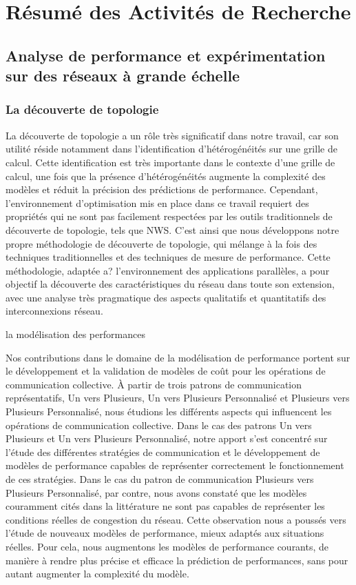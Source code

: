 \documentclass[a4paper]{book}
\begin{document}
\chapter{Résumé des Activités de Recherche}

\section{Analyse de performance et expérimentation sur des réseaux à grande échelle}



\subsection{La découverte de topologie}

La découverte de topologie a un rôle très significatif dans notre travail, car son utilité réside notamment dans l'identification d'hétérogénéités sur une grille de calcul. Cette identification est très importante dans le contexte d'une grille de calcul, une fois que la présence d'hétérogénéités augmente la complexité des modèles et réduit la précision des prédictions de performance.
Cependant, l'environnement d'optimisation mis en place dans ce travail requiert des propriétés qui ne sont pas facilement respectées par les outils traditionnels de découverte de topologie, tels que NWS. C'est ainsi que nous développons notre propre méthodologie de découverte de topologie, qui mélange à la fois des techniques traditionnelles et des techniques de mesure de performance. Cette méthodologie, adaptée a? l'environnement des applications parallèles, a pour objectif la découverte des caractéristiques du réseau dans toute son extension, avec une analyse très pragmatique des aspects qualitatifs et quantitatifs des interconnexions réseau.

la modélisation des performances

Nos contributions dans le domaine de la modélisation de performance portent sur le développement et la validation de modèles de coût pour les opérations de communication collective. À partir de trois patrons de communication représentatifs, Un vers Plusieurs, Un vers Plusieurs Personnalisé et Plusieurs vers Plusieurs Personnalisé, nous étudions les différents aspects qui influencent les opérations de communication collective.
Dans le cas des patrons Un vers Plusieurs et Un vers Plusieurs Personnalisé, notre apport s'est concentré sur l'étude des différentes stratégies de communication et le développement de modèles de performance capables de représenter correctement le fonctionnement de ces stratégies.
Dans le cas du patron de communication Plusieurs vers Plusieurs Personnalisé, par contre, nous avons constaté que les modèles couramment cités dans la littérature ne sont pas capables de représenter les conditions réelles de congestion du réseau. Cette observation nous a poussés vers l'étude de nouveaux modèles de performance, mieux adaptés aux situations réelles. Pour cela, nous augmentons les modèles de performance courants, de manière à rendre plus précise et efficace la prédiction de performances, sans pour autant augmenter la complexité du modèle.
\end{document}
